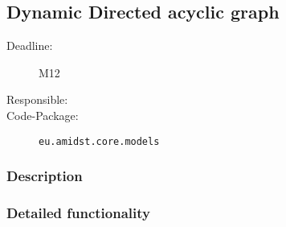 \subsection{Dynamic Directed acyclic graph}
\label{Functionality:ID}

\begin{description}
\item[Deadline:] M12
\item[Responsible:]
\item[Code-Package:] \texttt{eu.amidst.core.models}
\end{description}

\subsubsection*{Description}

\subsubsection*{Detailed functionality}
